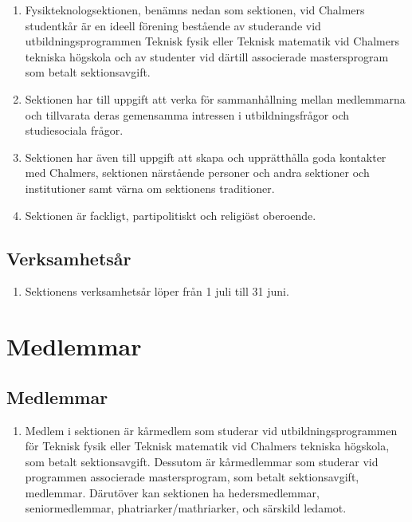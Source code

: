 \documentclass[11pt,a4paper]{article}
\begin{document}
\begin{enumerate}[\thesubsection .1]

  \item Fysikteknologsektionen, benämns nedan som sektionen, vid Chalmers studentkår är en ideell förening bestående av studerande vid utbildningsprogrammen Teknisk fysik eller Teknisk matematik vid Chalmers tekniska högskola och av studenter vid därtill associerade mastersprogram som betalt sektionsavgift.

  \item Sektionen har till uppgift att verka för samman\-hållning mellan
  med\-lem\-mar\-na och tillvarata deras gemensamma intressen i
  ut\-bild\-nings\-fråg\-or och studiesociala frågor.

  \item Sektionen har även till uppgift att skapa och upprätthålla
  goda kontakter med Chalmers, sektionen närstående personer och andra
  sektioner och institutioner samt värna om sektionens traditioner.

  \item Sektionen är fackligt, partipolitiskt och religiöst oberoende.

\end{enumerate}



\subsection{Verksamhetsår}

\begin{enumerate}[\thesubsection .1]

   \item Sektionens verksamhetsår löper från 1 juli till 31 juni.

\end{enumerate}

\newpage




\section{Medlemmar}
\subsection{Medlemmar}

\begin{enumerate}[\thesubsection .1]
   
   \item Medlem i sektionen är kårmedlem som studerar vid utbildningsprogrammen för Teknisk fysik eller Teknisk matematik vid Chalmers tekniska högskola, som betalt sektionsavgift. Dessutom är kårmedlemmar som studerar vid programmen associerade mastersprogram, som betalt sektionsavgift, medlemmar. Därutöver kan sektionen ha hedersmedlemmar, seniormedlemmar, phatriarker/mathriarker, och särskild ledamot.
   
\end{enumerate}
\end{document}
